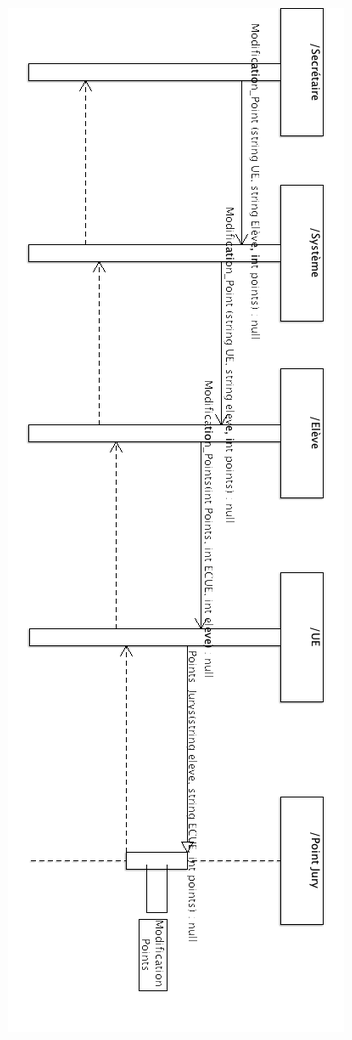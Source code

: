 \documentclass[letter, 11pt] {article}
\begin{document}
		
		\begin{figure}[htbp]
				\includegraphics[scale = 0.55]{../Diagrammes_sequence/Diagramme_sequence_points_jurys}
		\end{figure}
		
\end{document}
